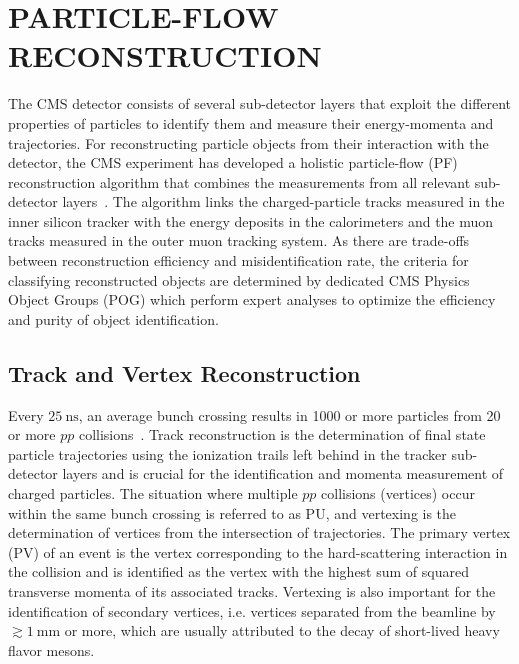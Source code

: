 
\chapter{PARTICLE-FLOW RECONSTRUCTION}
\label{Particle-Flow_Reconstruction}
The CMS detector consists of several sub-detector layers that exploit the different properties of particles to identify them and measure their energy-momenta and trajectories.
For reconstructing particle objects from their interaction with the detector, the CMS experiment has developed a holistic particle-flow (PF) reconstruction algorithm that combines the measurements from all relevant sub-detector layers~\cite{Sirunyan:2270046}.
The algorithm links the charged-particle tracks measured in the inner silicon tracker with the energy deposits in the calorimeters and the muon tracks measured in the outer muon tracking system.
As there are trade-offs between reconstruction efficiency and misidentification rate, the criteria for classifying reconstructed objects are determined by dedicated CMS Physics Object Groups (POG) which perform expert analyses to optimize the efficiency and purity of object identification.

\section{Track and Vertex Reconstruction}
Every $\SI{25}{\ns}$, an average bunch crossing results in 1000 or more particles from 20 or more $pp$ collisions~\cite{Chatrchyan:1129810}.
Track reconstruction is the determination of final state particle trajectories using the ionization trails left behind in the tracker sub-detector layers and is crucial for the identification and momenta measurement of charged particles.
The situation where multiple $pp$ collisions (vertices) occur within the same bunch crossing is referred to as PU, and vertexing is the determination of vertices from the intersection of trajectories.
The primary vertex (PV) of an event is the vertex corresponding to the hard-scattering interaction in the collision and is identified as the vertex with the highest sum of squared transverse momenta of its associated tracks.
Vertexing is also important for the identification of secondary vertices, i.e. vertices separated from the beamline by $\gtrsim \SI{1}{\mm}$ or more, which are usually attributed to the decay of short-lived heavy flavor mesons.

